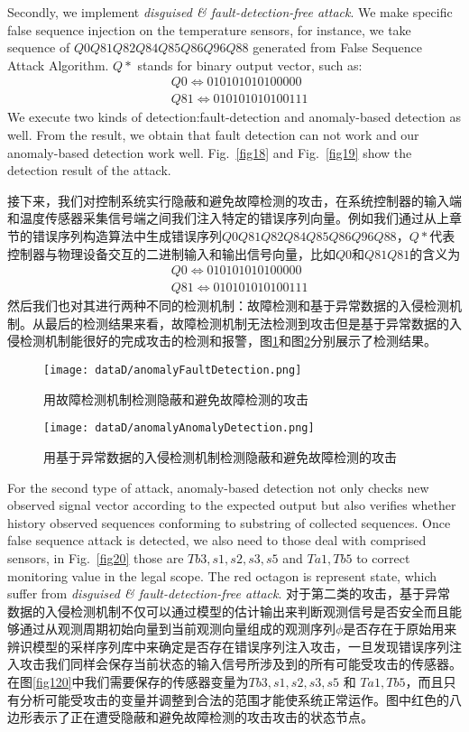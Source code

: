 	Secondly, we implement \textit{disguised \& fault-detection-free attack}. We make specific false sequence injection on the temperature sensors, for instance, we take sequence of $Q0Q81Q82Q84Q85Q86Q96Q88
	$ generated from False Sequence Attack Algorithm. $Q*$ stands for binary output vector, such as:\[\begin{split}
	&Q0\Leftrightarrow 010101010100000\\
	&Q81\Leftrightarrow 010101010100111
	\end{split}
	\]  We execute two kinds of detection:fault-detection and anomaly-based detection as well. From the result, we obtain that fault detection can not work and our anomaly-based detection work well. Fig.~\ref{fig18} and Fig.~\ref{fig19} show the detection result of the attack.

	接下来，我们对控制系统实行隐蔽和避免故障检测的攻击，在系统控制器的输入端和温度传感器采集信号端之间我们注入特定的错误序列向量。例如我们通过从上章节的错误序列构造算法中生成错误序列$Q0Q81Q82Q84Q85Q86Q96Q88$，$Q*$代表控制器与物理设备交互的二进制输入和输出信号向量，比如$Q0$和$Q81Q81$的含义为\[\begin{split}
	&Q0\Leftrightarrow 010101010100000\\
	&Q81\Leftrightarrow 010101010100111
	\end{split}
	\] 然后我们也对其进行两种不同的检测机制：故障检测和基于异常数据的入侵检测机制。从最后的检测结果来看，故障检测机制无法检测到攻击但是基于异常数据的入侵检测机制能很好的完成攻击的检测和报警，图\ref{fig118}和图\ref{fig119}分别展示了检测结果。
	
		\begin{figure}[!htb]
			\centering
			\texttt{[image: dataD/anomalyFaultDetection.png]}
			\caption{用故障检测机制检测隐蔽和避免故障检测的攻击}
			\label{fig118}
		\end{figure}
		
		\begin{figure}[!htb]
			\centering
			\texttt{[image: dataD/anomalyAnomalyDetection.png]}
			\caption{用基于异常数据的入侵检测机制检测隐蔽和避免故障检测的攻击}
			\label{fig119}
		\end{figure}
	
	For the second type of attack, anomaly-based detection not only checks new observed signal vector according to the expected output but also verifies whether history observed sequences conforming to substring of collected sequences. Once false sequence attack is detected, we also need to  those deal with comprised sensors, in 
	Fig.~\ref{fig20} those are $Tb3,s1,s2,s3,s5$ and $Ta1,Tb5$ to correct monitoring value in the legal scope. The red octagon is represent state, which suffer from \textit{disguised \& fault-detection-free attack}.
	对于第二类的攻击，基于异常数据的入侵检测机制不仅可以通过模型的估计输出来判断观测信号是否安全而且能够通过从观测周期初始向量到当前观测向量组成的观测序列$\phi$是否存在于原始用来辨识模型的采样序列库中来确定是否存在错误序列注入攻击，一旦发现错误序列注入攻击我们同样会保存当前状态的输入信号所涉及到的所有可能受攻击的传感器。在图\ref{fig120}中我们需要保存的传感器变量为$Tb3,s1,s2,s3,s5$ 和 $Ta1,Tb5$，而且只有分析可能受攻击的变量并调整到合法的范围才能使系统正常运作。图中红色的八边形表示了正在遭受隐蔽和避免故障检测的攻击攻击的状态节点。
	
